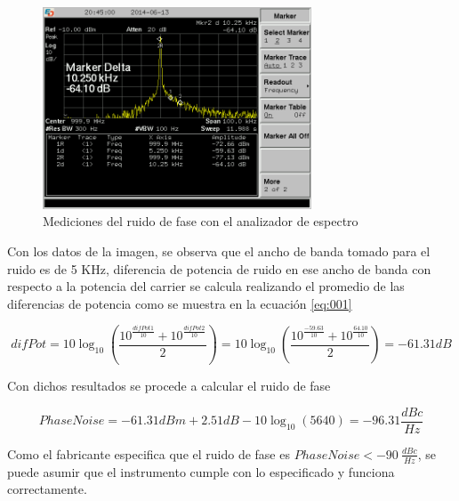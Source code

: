 \documentclass[a4paper,10pt]{article}
\begin{document}
		\begin{figure}[!htb]
			\centering
			\includegraphics[width=8cm]
			{Imagenes/SCREN451.png}
			\caption{Mediciones del ruido de fase con el analizador de espectro}
			\label{img:003} 
		\end{figure}
		
		\indent Con los datos de la imagen, se observa que el ancho de banda 
		tomado para el ruido es de 5 KHz, diferencia de potencia de ruido en ese
		ancho de banda con respecto a la potencia del carrier se calcula 
		realizando el promedio de las diferencias de potencia como se muestra en
		la ecuaci\'on \ref{eq:001}

		\begin{equation} \label{eq:001}
			difPot = 10\log_{10}(\frac{10^{\frac{difPot1}{10}} + 10^{\frac
			{difPot2}{10}}}{2}) = 10\log_{10}(\frac{10^{\frac{-59.63}{10}} + 
			10^{\frac{64.10}{10}}}{2}) = -61.31 dB
		\end{equation}

		\indent Con dichos resultados se procede a calcular el ruido de fase
		
		\begin{equation*}
			PhaseNoise = -61.31dBm + 2.51dB - 10\log_{10}(5640) = -96.31 
			\frac{dBc}{Hz}
		\end{equation*}
		
		\indent Como el fabricante especifica que el ruido de fase es 
		$Phase Noise<-90~\frac{dBc}{Hz}$, se puede asumir que el instrumento 
		cumple con lo especificado y funciona correctamente.
		
\end{document}
